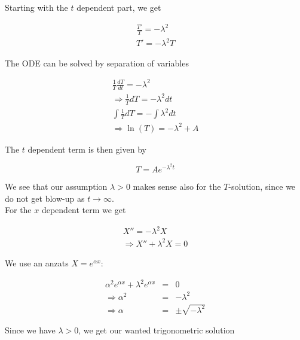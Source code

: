 \documentclass{article}
\begin{document}
Starting with the $t$ dependent part, we get

\begin{eqnarray}
\frac{T'}{T} = -\lambda^2 \\ 
T' = -\lambda^2 T
\end{eqnarray}

The ODE can be solved by separation of variables

\begin{subequations}
	\begin{eqnarray}
	\label{eqn:solvingTdependentTransientTerm1D}
	\frac{1}{T}\frac{dT}{dt} = -\lambda^2 \\ 
	\Rightarrow \frac{1}{T} dT = -\lambda^2 dt\\
	\int \frac{1}{T}dT = - \int \lambda^2 dt \\
	\Rightarrow \ln(T) = -\lambda^2 + A
	\end{eqnarray}
\end{subequations}

The $t$ dependent term is then given by

\begin{equation}
T = Ae^{-\lambda^2 t}
\label{eqn:tdependentTransientTerm1D}
\end{equation}

We see that our assumption $\lambda > 0$ makes sense also for the $T$-solution, since we do not get blow-up as $t \rightarrow \infty$. \\

For the $x$ dependent term we get

\begin{subequations}
	\begin{eqnarray}
	X'' = -\lambda^2 X \\
	\Rightarrow X'' + \lambda^2 X = 0 
	\end{eqnarray}
\end{subequations}

We use an anzats $X=e^{\alpha x}$:

\begin{subequations}
	\begin{eqnarray}
	\alpha^2 e^{\alpha x} + \lambda^2 e^{\alpha x} &=& 0 \\ 
	\Rightarrow \alpha^2 &=& -\lambda^2 \\ 
	\Rightarrow \alpha &=& \pm \sqrt{-\lambda^2}
	\end{eqnarray}
\end{subequations}

Since we have $\lambda > 0$, we get our wanted trigonometric solution
\end{document}

